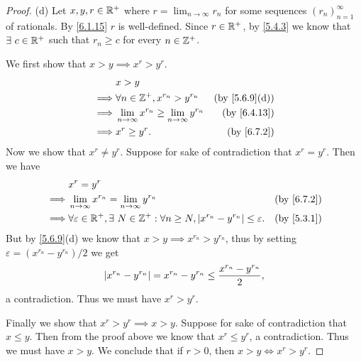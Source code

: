\begin{proof}{(d)}
  Let \(x, y, r \in \mathbb{R}^+\) where \(r = \lim_{n \to \infty} r_n\) for some sequences \((r_n)_{n = 1}^\infty\) of rationals.
  By \cref{6.1.15} \(r\) is well-defined.
  Since \(r \in \mathbb{R}^+\), by \cref{5.4.3} we know that \(\exists\ c \in \mathbb{R}^+\) such that \(r_n \geq c\) for every \(n \in \mathbb{Z}^+\).

  We first show that \(x > y \implies x^r > y^r\).
  \begin{align*}
             & x > y                                                                                      \\
    \implies & \forall n \in \Z^+, x^{r_n} > y^{r_n}                        & \text{(by \cref{5.6.9}(d))} \\
    \implies & \lim_{n \to \infty} x^{r_n} \geq \lim_{n \to \infty} y^{r_n} & \text{(by \cref{6.4.13})}   \\
    \implies & x^r \geq y^r.                                                & \text{(by \cref{6.7.2})}
  \end{align*}
  Now we show that \(x^r \neq y^r\).
  Suppose for sake of contradiction that \(x^r = y^r\).
  Then we have
  \begin{align*}
             & x^r = y^r                                                                                                                                  \\
    \implies & \lim_{n \to \infty} x^{r_n} = \lim_{n \to \infty} y^{r_n}                                                       & \text{(by \cref{6.7.2})} \\
    \implies & \forall \varepsilon \in \R^+, \exists\ N \in \Z^+ : \forall n \geq N, \abs{x^{r_n} - y^{r_n}} \leq \varepsilon. & \text{(by \cref{5.3.1})}
  \end{align*}
  But by \cref{5.6.9}(d) we know that \(x > y \implies x^{r_n} > y^{r_n}\), thus by setting \(\varepsilon = (x^{r_n} - y^{r_n}) / 2\) we get
  \[
    \left\lvert x^{r_n} - y^{r_n}\right\rvert = x^{r_n} - y^{r_n} \leq \frac{x^{r_n} - y^{r_n}}{2},
  \]
  a contradiction.
  Thus we must have \(x^r > y^r\).

  Finally we show that \(x^r > y^r \implies x > y\).
  Suppose for sake of contradiction that \(x \leq y\).
  Then from the proof above we know that \(x^r \leq y^r\), a contradiction.
  Thus we must have \(x > y\).
  We conclude that if \(r > 0\), then \(x > y \iff x^r > y^r\).
\end{proof}

